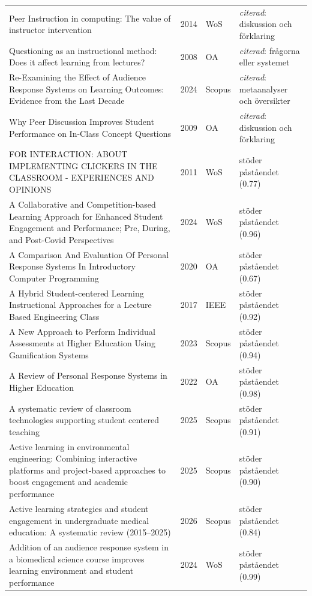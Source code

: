 \begin{longtable}{@{}%
  >{\raggedright\arraybackslash}p{}c%
  >{\raggedright\arraybackslash}p{}%
  >{\raggedright\arraybackslash}p{}@{}}
Peer Instruction in computing: The value of instructor intervention & 2014 & WoS & \emph{citerad}: diskussion och förklaring \\
Questioning as an instructional method: Does it affect learning from lectures? & 2008 & OA & \emph{citerad}: frågorna eller systemet \\
Re-Examining the Effect of Audience Response Systems on Learning Outcomes: Evidence from the Last Decade & 2024 & Scopus & \emph{citerad}: metaanalyser och översikter \\
Why Peer Discussion Improves Student Performance on In-Class Concept Questions & 2009 & OA & \emph{citerad}: diskussion och förklaring \\
<CLICK HERE> FOR INTERACTION: ABOUT IMPLEMENTING CLICKERS IN THE CLASSROOM - EXPERIENCES AND OPINIONS & 2011 & WoS & stöder påståendet (0.77) \\
A Collaborative and Competition-based Learning Approach for Enhanced Student Engagement and Performance; Pre, During, and Post-Covid Perspectives & 2024 & WoS & stöder påståendet (0.96) \\
A Comparison And Evaluation Of Personal Response Systems In Introductory Computer Programming & 2020 & OA & stöder påståendet (0.67) \\
A Hybrid Student-centered Learning Instructional Approaches for a Lecture Based Engineering Class & 2017 & IEEE & stöder påståendet (0.92) \\
A New Approach to Perform Individual Assessments at Higher Education Using Gamification Systems & 2023 & Scopus & stöder påståendet (0.94) \\
A Review of Personal Response Systems in Higher Education & 2022 & OA & stöder påståendet (0.98) \\
A systematic review of classroom technologies supporting student centered teaching & 2025 & Scopus & stöder påståendet (0.91) \\
Active learning in environmental engineering: Combining interactive platforms and project-based approaches to boost engagement and academic performance & 2025 & Scopus & stöder påståendet (0.90) \\
Active learning strategies and student engagement in undergraduate medical education: A systematic review (2015--2025) & 2026 & Scopus & stöder påståendet (0.84) \\
Addition of an audience response system in a biomedical science course improves learning environment and student performance & 2024 & WoS & stöder påståendet (0.99) \\

\end{longtable}
